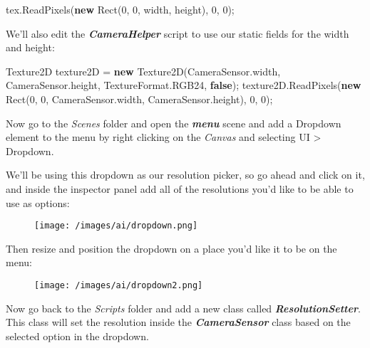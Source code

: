 \documentclass[
]{article}
\newenvironment{Shaded}{}{}
\newcommand{\DecValTok}[1]{\textcolor[rgb]{0.25,0.63,0.44}{#1}}
\newcommand{\FunctionTok}[1]{\textcolor[rgb]{0.02,0.16,0.49}{#1}}
\newcommand{\KeywordTok}[1]{\textcolor[rgb]{0.00,0.44,0.13}{\textbf{#1}}}
\newcommand{\NormalTok}[1]{#1}
\begin{document}
\begin{Shaded}
\begin{Highlighting}[]
\NormalTok{tex.}\FunctionTok{ReadPixels}\NormalTok{(}\KeywordTok{new} \FunctionTok{Rect}\NormalTok{(}\DecValTok{0}\NormalTok{, }\DecValTok{0}\NormalTok{, width, height), }\DecValTok{0}\NormalTok{, }\DecValTok{0}\NormalTok{);}
\end{Highlighting}
\end{Shaded}

We'll also edit the \textbf{\emph{CameraHelper}} script to use our
static fields for the width and height:

\begin{Shaded}
\begin{Highlighting}[]
\NormalTok{Texture2D texture2D = }\KeywordTok{new} \FunctionTok{Texture2D}\NormalTok{(CameraSensor.}\FunctionTok{width}\NormalTok{, CameraSensor.}\FunctionTok{height}\NormalTok{, TextureFormat.}\FunctionTok{RGB24}\NormalTok{, }\KeywordTok{false}\NormalTok{);}
\NormalTok{texture2D.}\FunctionTok{ReadPixels}\NormalTok{(}\KeywordTok{new} \FunctionTok{Rect}\NormalTok{(}\DecValTok{0}\NormalTok{, }\DecValTok{0}\NormalTok{, CameraSensor.}\FunctionTok{width}\NormalTok{, CameraSensor.}\FunctionTok{height}\NormalTok{), }\DecValTok{0}\NormalTok{, }\DecValTok{0}\NormalTok{);}
\end{Highlighting}
\end{Shaded}

Now go to the \emph{Scenes} folder and open the \textbf{\emph{menu}}
scene and add a Dropdown element to the menu by right clicking on the
\emph{Canvas} and selecting UI \textgreater{} Dropdown.

We'll be using this dropdown as our resolution picker, so go ahead and
click on it, and inside the inspector panel add all of the resolutions
you'd like to be able to use as options:

\begin{figure}
\centering
\texttt{[image: /images/ai/dropdown.png]}
\caption{}
\end{figure}

Then resize and position the dropdown on a place you'd like it to be on
the menu:

\begin{figure}
\centering
\texttt{[image: /images/ai/dropdown2.png]}
\caption{}
\end{figure}

Now go back to the \emph{Scripts} folder and add a new class called
\textbf{\emph{ResolutionSetter}}. This class will set the resolution
inside the \textbf{\emph{CameraSensor}} class based on the selected
option in the dropdown.
\end{document}
